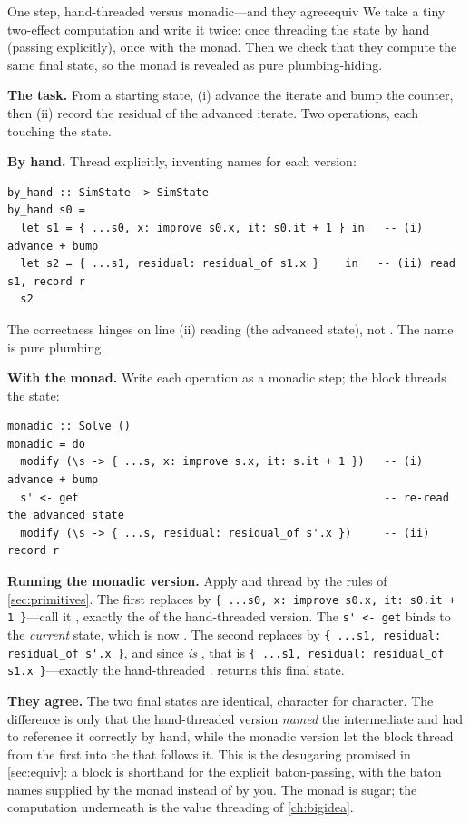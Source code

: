 \begin{workedexample}{One step, hand-threaded versus monadic---and they agree}{equiv}
We take a tiny two-effect computation and write it twice: once threading the state by
hand (passing  explicitly), once with the monad. Then we check that they
compute the same final state, so the monad is revealed as pure plumbing-hiding.

\textbf{The task.} From a starting state, (i) advance the iterate and bump the
counter, then (ii) record the residual of the advanced iterate. Two operations, each
touching the state.

\textbf{By hand.} Thread  explicitly, inventing names for each version:
\begin{lstlisting}[style=l4style]
by_hand :: SimState -> SimState
by_hand s0 =
  let s1 = { ...s0, x: improve s0.x, it: s0.it + 1 } in   -- (i) advance + bump
  let s2 = { ...s1, residual: residual_of s1.x }    in   -- (ii) read s1, record r
  s2
\end{lstlisting}
The correctness hinges on line (ii) reading  (the advanced state), not
. The name  is pure plumbing.

\textbf{With the monad.} Write each operation as a monadic step; the  block
threads the state:
\begin{lstlisting}[style=l4style]
monadic :: Solve ()
monadic = do
  modify (\s -> { ...s, x: improve s.x, it: s.it + 1 })   -- (i) advance + bump
  s' <- get                                               -- re-read the advanced state
  modify (\s -> { ...s, residual: residual_of s'.x })     -- (ii) record r
\end{lstlisting}

\tcblower
\textbf{Running the monadic version.} Apply  and thread by
the rules of \cref{sec:primitives}. The first  replaces  by
\lstinline[style=l4style]|{ ...s0, x: improve s0.x, it: s0.it + 1 }|---call it
, exactly the  of the hand-threaded version. The
\lstinline[style=l4style]|s' <- get| binds  to the \emph{current} state,
which is now . The second  replaces  by
\lstinline[style=l4style]|{ ...s1, residual: residual_of s'.x }|, and since
 \emph{is} , that is
\lstinline[style=l4style]|{ ...s1, residual: residual_of s1.x }|---exactly the
hand-threaded .  returns this final state.

\textbf{They agree.} The two final states are identical, character for character. The
difference is only that the hand-threaded version \emph{named} the intermediate
 and had to reference it correctly by hand, while the monadic version let the
 block thread  from the first  into the  that
follows it. This is the desugaring promised in \cref{sec:equiv}: a  block is
shorthand for the explicit baton-passing, with the baton names supplied by the monad
instead of by you. The monad is sugar; the computation underneath is the value
threading of \cref{ch:bigidea}.
\end{workedexample}

